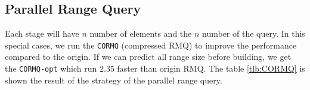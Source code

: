 

\subsection{Parallel Range Query}

Each stage will have $n$ number of elements and the $n$ number of the
query.  In this special cases, we run the \texttt{CORMQ} (compressed
RMQ) to improve the performance compared to the origin.  If we can
predict all range size before building, we get the \texttt{CORMQ-opt}
which run $2.35$ faster than origin RMQ.  The table \ref{tlb:CORMQ} is
shown the result of the strategy of the parallel range query.

